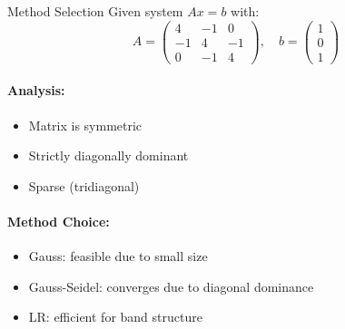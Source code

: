 \begin{example2}{Method Selection}
Given system $Ax=b$ with:
$$A = \begin{pmatrix} 
4 & -1 & 0 \\
-1 & 4 & -1 \\
0 & -1 & 4
\end{pmatrix}, \quad b = \begin{pmatrix} 1 \\ 0 \\ 1 \end{pmatrix}$$

\paragraph{Analysis:}
\begin{itemize}
    \item Matrix is symmetric
    \item Strictly diagonally dominant
    \item Sparse (tridiagonal)
\end{itemize}

\paragraph{Method Choice:}
\begin{itemize}
    \item Gauss: feasible due to small size
    \item Gauss-Seidel: converges due to diagonal dominance
    \item LR: efficient for band structure
\end{itemize}
\end{example2}

